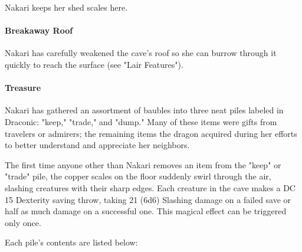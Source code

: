 \documentclass[letterpaper, 11pt, twocolumn]{dndbook}
\begin{document}
Nakari keeps her shed scales here.

\paragraph{Breakaway Roof}

Nakari has carefully weakened the cave's roof so she can burrow through it quickly to reach the surface (see "Lair Features").

\paragraph{Treasure}

Nakari has gathered an assortment of baubles into three neat piles labeled in Draconic: "keep," "trade," and "dump." Many of these items were gifts from travelers or admirers; the remaining items the dragon acquired during her efforts to better understand and appreciate her neighbors.

The first time anyone other than Nakari removes an item from the "keep" or "trade" pile, the copper scales on the floor suddenly swirl through the air, slashing creatures with their sharp edges. Each creature in the cave makes a DC 15 Dexterity saving throw, taking 21 (6d6) Slashing damage on a failed save or half as much damage on a successful one. This magical effect can be triggered only once.

Each pile's contents are listed below:
\end{document}
